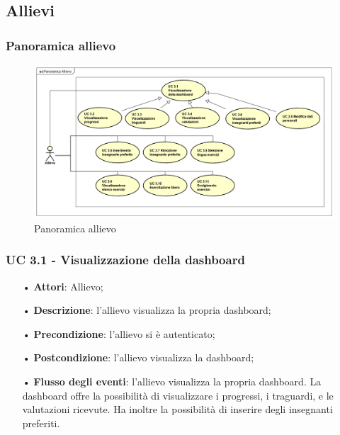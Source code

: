 \subsection{Allievi}
\subsubsection{Panoramica allievo}

\begin{figure}[H]
\centering
\includegraphics[width=17cm]{img/PanoramicaAllievi.png} 
\caption{Panoramica allievo}\label{fig:31}
\end{figure}


\subsubsection{UC 3.1 - Visualizzazione della dashboard}
\begin{itemize}
\item[•]\textbf{Attori}: Allievo;
\item[•]\textbf{Descrizione}: l'allievo visualizza la propria dashboard;
\item[•]\textbf{Precondizione}: l'allievo si è autenticato;
\item[•]\textbf{Postcondizione}: l'allievo visualizza la dashboard;
\item[•]\textbf{Flusso degli eventi}: l'allievo visualizza la propria dashboard. La dashboard offre la possibilità di visualizzare i progressi, i traguardi, e le valutazioni ricevute. Ha inoltre la possibilità di inserire degli insegnanti preferiti.
\end{itemize}

